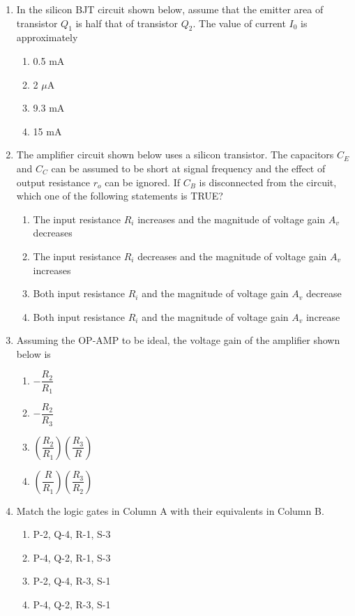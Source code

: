 \documentclass[journal,12pt,onecolumn]{IEEEtran}
\begin{document}
\begin{enumerate}
\item In the silicon BJT circuit shown below, assume that the emitter area of transistor $Q_1$ is half that of transistor $Q_2$. The value of current $I_0$ is approximately
\begin{multicols}{2}
\begin{enumerate}
\item 0.5 mA
\item 2 $\mu$A
\item 9.3 mA
\item 15 mA
\end{enumerate}
\end{multicols}

\item The amplifier circuit shown below uses a silicon transistor. The capacitors $C_E$ and $C_C$ can be assumed to be short at signal frequency and the effect of output resistance $r_o$ can be ignored. If $C_B$ is disconnected from the circuit, which one of the following statements is TRUE?
\begin{multicols}{2}
\begin{enumerate}
\item The input resistance $R_i$ increases and the magnitude of voltage gain $A_v$ decreases
\item The input resistance $R_i$ decreases and the magnitude of voltage gain $A_v$ increases
\item Both input resistance $R_i$ and the magnitude of voltage gain $A_v$ decrease
\item Both input resistance $R_i$ and the magnitude of voltage gain $A_v$ increase
\end{enumerate}
\end{multicols}

\item Assuming the OP-AMP to be ideal, the voltage gain of the amplifier shown below is
\begin{multicols}{2}
\begin{enumerate}
\item $-\dfrac{R_2}{R_1}$
\item $-\dfrac{R_2}{R_3}$
\item $\left(\dfrac{R_2}{R_1}\right)\left(\dfrac{R_3}{R}\right)$
\item $\left(\dfrac{R}{R_1}\right)\left(\dfrac{R_3}{R_2}\right)$
\end{enumerate}
\end{multicols}

\item Match the logic gates in Column A with their equivalents in Column B.\\

\begin{multicols}{2}
\begin{enumerate}
\item P-2, Q-4, R-1, S-3
\item P-4, Q-2, R-1, S-3
\item P-2, Q-4, R-3, S-1
\item P-4, Q-2, R-3, S-1
\end{enumerate}
\end{multicols}


\end{enumerate}
\end{document}
